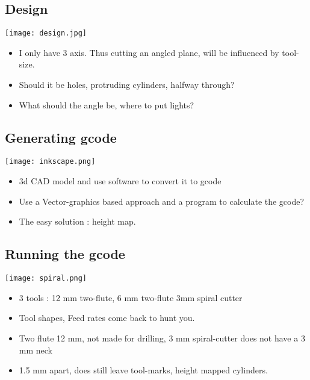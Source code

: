 \documentclass[11pt]{beamer}
\begin{document}
\subsection*{Design}\begin{frame}[fragile]
\label{sec-5.1}

\texttt{[image: design.jpg]}
\begin{itemize}
\item I only have 3 axis. Thus cutting an angled plane, will be
      influenced by tool-size.
\item Should it be holes, protruding cylinders, halfway through?
\item What should the angle be, where to put lights? \\
\end{itemize}
\end{frame}
\subsection*{Generating gcode}\begin{frame}[fragile]
\label{sec-5.2}

\texttt{[image: inkscape.png]}
\begin{itemize}
\item 3d CAD model and use software to convert it to gcode
\item Use a Vector-graphics based approach and a program to calculate the gcode?
\item The easy solution : height map.
\end{itemize}
\end{frame}
\subsection*{Running the gcode}\begin{frame}[fragile]
\label{sec-5.3}

\texttt{[image: spiral.png]}
\begin{itemize}
\item 3 tools : 12 mm two-flute, 6 mm two-flute 3mm spiral cutter
\item Tool shapes, Feed rates come back to hunt you.
\item Two flute 12 mm, not made for drilling,  3 mm spiral-cutter does not have a 3 mm neck
\item 1.5 mm apart, does still leave tool-marks, height mapped
     cylinders.
\end{itemize}
\end{frame}
\end{document}
